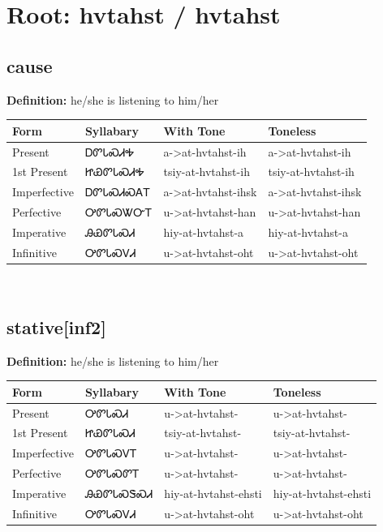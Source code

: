 \documentclass{article}%
\begin{document}
%
\normalsize%
\section*{Root: hvtahst / hvtahst}%
\subsection*{cause}%
\textbf{Definition: }%
he/she is listening to him/her%
\\[0.5em]%
\begin{tabular}{|l|l|l|l|}%
\hline%
\textbf{Form}&\textbf{Syllabary}&\textbf{With Tone}&\textbf{Toneless}\\%
\hline%
Present&ᎠᏛᏓᏍᏗᎭ&a{-}>at{-}hvtahst{-}ih&a{-}>at{-}hvtahst{-}ih\\%
1st Present&ᏥᏯᏛᏓᏍᏗᎭ&tsiy{-}at{-}hvtahst{-}ih&tsiy{-}at{-}hvtahst{-}ih\\%
Imperfective&ᎠᏛᏓᏍᏗᏍᎪᎢ&a{-}>at{-}hvtahst{-}ihsk&a{-}>at{-}hvtahst{-}ihsk\\%
Perfective&ᎤᏛᏓᏍᏔᏅᎢ&u{-}>at{-}hvtahst{-}han&u{-}>at{-}hvtahst{-}han\\%
Imperative&ᎯᏯᏛᏓᏍᏗ&hiy{-}at{-}hvtahst{-}a&hiy{-}at{-}hvtahst{-}a\\%
Infinitive&ᎤᏛᏓᏍᏙᏗ&u{-}>at{-}hvtahst{-}oht&u{-}>at{-}hvtahst{-}oht\\%
\hline%
\end{tabular}%
\\[1em]%
\subsection*{stative[inf2]}%
\textbf{Definition: }%
he/she is listening to him/her%
\\[0.5em]%
\begin{tabular}{|l|l|l|l|}%
\hline%
\textbf{Form}&\textbf{Syllabary}&\textbf{With Tone}&\textbf{Toneless}\\%
\hline%
Present&ᎤᏛᏓᏍᏗ&u{-}>at{-}hvtahst{-}&u{-}>at{-}hvtahst{-}\\%
1st Present&ᏥᏯᏛᏓᏍᏗ&tsiy{-}at{-}hvtahst{-}&tsiy{-}at{-}hvtahst{-}\\%
Imperfective&ᎤᏛᏓᏍᏙᎢ&u{-}>at{-}hvtahst{-}&u{-}>at{-}hvtahst{-}\\%
Perfective&ᎤᏛᏓᏍᏛᎢ&u{-}>at{-}hvtahst{-}&u{-}>at{-}hvtahst{-}\\%
Imperative&ᎯᏯᏛᏓᏍᏕᏍᏗ&hiy{-}at{-}hvtahst{-}ehsti&hiy{-}at{-}hvtahst{-}ehsti\\%
Infinitive&ᎤᏛᏓᏍᏙᏗ&u{-}>at{-}hvtahst{-}oht&u{-}>at{-}hvtahst{-}oht\\%
\hline%
\end{tabular}%
\\[1em]%
\end{document}
